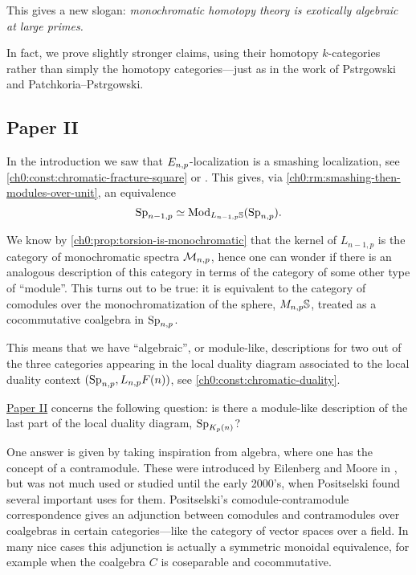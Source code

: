 This gives a new slogan: \emph{monochromatic homotopy theory is exotically algebraic at large primes.} 

In fact, we prove slightly stronger claims, using their homotopy $k$-categories rather than simply the homotopy categories---just as in the work of Pstr\a{}gowski and Patchkoria--Pstr\a{}gowski. 








\subsection{Paper II}

In the introduction we saw that $E_{n,p}$-localization is a smashing localization, see \cref{ch0:const:chromatic-fracture-square} or \cite[7.5.6]{ravenel_92}. This gives, via \cref{ch0:rm:smashing-then-modules-over-unit}, an equivalence 
\[\mathrm{Sp}_{n-1,p} \simeq \mathrm{Mod}_{L_{n-1,p}\mathbb{S}}(\mathrm{Sp}_{n,p}).\]

We know by \cref{ch0:prop:torsion-is-monochromatic} that the kernel of $L_{n-1,p}$ is the category of monochromatic spectra $\mathcal{M}_{n,p}$, hence one can wonder if there is an analogous description of this category in terms of the category of some other type of ``module''. This turns out to be true: it is equivalent to the category of comodules over the monochromatization of the sphere, $M_{n,p} \mathbb{S}$, treated as a cocommutative coalgebra in $\mathrm{Sp}_{n,p}$. 

This means that we have ``algebraic'', or module-like, descriptions for two out of the three categories appearing in the local duality diagram associated to the local duality context $(\mathrm{Sp}_{n,p}, L_{n,p} F(n))$, see \cref{ch0:const:chromatic-duality}. 

\hyperref[ch2]{Paper II} concerns the following question: is there a module-like description of the last part of the local duality diagram, $\mathrm{Sp}_{K_p(n)}$? 

One answer is given by taking inspiration from algebra, where one has the concept of a contramodule. These were introduced by Eilenberg and Moore in \cite{eilenberg-moore_65}, but was not much used or studied until the early 2000's, when Positselski found several important uses for them. Positselski's comodule-contramodule correspondence gives an adjunction between comodules and contramodules over coalgebras in certain categories---like the category of vector spaces over a field. In many nice cases this adjunction is actually a symmetric monoidal equivalence, for example when the coalgebra $C$ is coseparable and cocommutative. 

